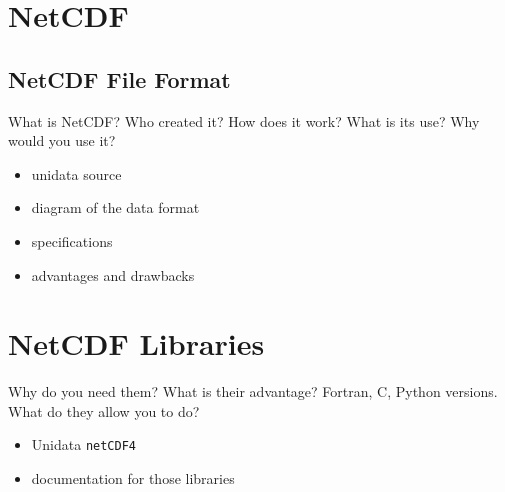\documentclass[../00_main.tex]{subfiles}
\begin{document}
\section{NetCDF}

\subsection{NetCDF File Format}

What is NetCDF? Who created it? How does it work? What is its use? Why would
you use it?
\begin{itemize}
    \item unidata source
    \item diagram of the data format
    \item specifications
    \item advantages and drawbacks
\end{itemize}

\section{NetCDF Libraries}

Why do you need them? What is their advantage? Fortran, C, Python versions.
What do they allow you to do?
\begin{itemize}
    \item Unidata \texttt{netCDF4}
    \item documentation for those libraries
\end{itemize}
\end{document}
